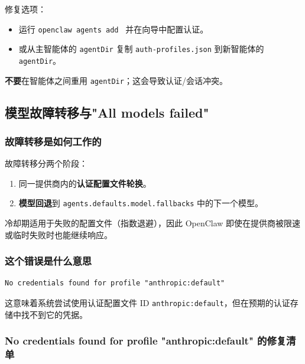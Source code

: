 修复选项：

\begin{itemize}
  \item 运行 \texttt{openclaw agents add } 并在向导中配置认证。
  \item 或从主智能体的 \texttt{agentDir} 复制 \texttt{auth-profiles.json} 到新智能体的 \texttt{agentDir}。
\end{itemize}


\textbf{不要}在智能体之间重用 \texttt{agentDir}；这会导致认证/会话冲突。

\subsection{模型故障转移与"All models failed"}


\subsubsection{故障转移是如何工作的}


故障转移分两个阶段：

\begin{enumerate}
  \item 同一提供商内的\textbf{认证配置文件轮换}。
  \item \textbf{模型回退}到 \texttt{agents.defaults.model.fallbacks} 中的下一个模型。
\end{enumerate}


冷却期适用于失败的配置文件（指数退避），因此 OpenClaw 即使在提供商被限速或临时失败时也能继续响应。

\subsubsection{这个错误是什么意思}


\begin{lstlisting}
No credentials found for profile "anthropic:default"
\end{lstlisting}


这意味着系统尝试使用认证配置文件 ID \texttt{anthropic:default}，但在预期的认证存储中找不到它的凭据。

\subsubsection{No credentials found for profile "anthropic:default" 的修复清单}


